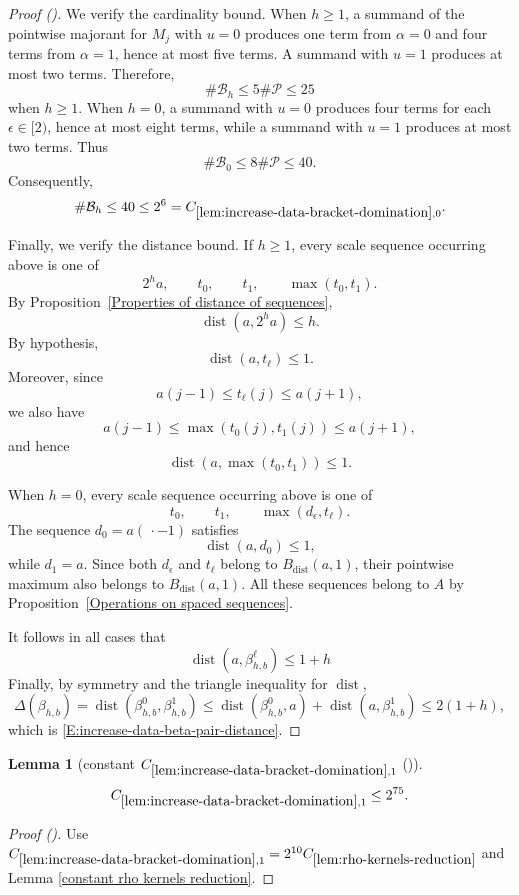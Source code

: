 \documentclass[12pt,reqno]{amsart}
\newcommand{\auto}{{({\tiny\faCar})}}
\theoremstyle{plain}
\newtheorem{lemma}[theorem]{Lemma}
\numberwithin{equation}{section}
\theoremstyle{remark}
\newcommand{\using}[1]{}
\DeclareMathOperator{\dist}{dist}
\begin{document}
\begin{proof}[Proof \auto]
We verify the cardinality bound. When \(h\geq1\), a summand of the
pointwise majorant for \(M_j\) with \(u=0\) produces one term from
\(\alpha=0\) and four terms from \(\alpha=1\), hence at most five
terms. A summand with \(u=1\) produces at most two terms. Therefore,
\[
\#\mathcal B_h
\leq
5\#\mathcal P
\leq
25
\]
when \(h\geq1\). When \(h=0\), a summand with \(u=0\) produces four
terms for each \(\epsilon\in[2)\), hence at most eight terms, while
a summand with \(u=1\) produces at most two terms. Thus
\[
\#\mathcal B_0
\leq
8\#\mathcal P
\leq
40.
\]
Consequently,
\[
\#\mathcal B_h
\leq
40
\leq
2^6
=
C_{\ref{lem:increase-data-bracket-domination},0}.
\]

Finally, we verify the distance bound. If \(h\geq1\), every scale
sequence occurring above is one of
\[
2^ha,\qquad
t_0,\qquad
t_1,\qquad
\max(t_0,t_1).
\]
By Proposition~\ref{Properties of distance of sequences},
\[
\dist(a,2^ha)\leq h.
\]
By hypothesis,
\[
\dist(a,t_\ell)\leq1.
\]
Moreover, since
\[
a(j-1)\leq t_\ell(j)\leq a(j+1),
\]
we also have
\[
a(j-1)
\leq
\max(t_0(j),t_1(j))
\leq
a(j+1),
\]
and hence
\[
\dist(a,\max(t_0,t_1))\leq1.
\]

When \(h=0\), every scale sequence occurring above is one of
\[
t_0,\qquad
t_1,\qquad
\max(d_\epsilon,t_\ell).
\]
The sequence \(d_0=a(\,\cdot-1)\) satisfies
\[
\dist(a,d_0)\leq1,
\]
while \(d_1=a\). Since both \(d_\epsilon\) and \(t_\ell\) belong to
\(B_{\dist}(a,1)\), their pointwise maximum also belongs to
\(B_{\dist}(a,1)\). All these sequences belong to \(A\) by
Proposition~\ref{Operations on spaced sequences}.

It follows in all cases that
\[
\dist(a,\beta_{h,b}^\ell)
\leq
1+h
\]
Finally, by symmetry and the triangle inequality for \(\dist\),
\[
\Delta(\beta_{h,b}) = \dist(\beta_{h,b}^0,\beta_{h,b}^1) \leq \dist(\beta_{h,b}^0,a) + \dist(a,\beta_{h,b}^1) \leq 2(1+h),
\]
which is
\eqref{E:increase-data-beta-pair-distance}.
\end{proof}

\begin{lemma}[constant $C_{\ref{lem:increase-data-bracket-domination},1}$ \auto]\label{constant increase data bracket domination}\using{lem:increase-data-bracket-domination}\using{lem:rho-kernels-reduction}\using{constant rho kernels reduction}
\begin{equation}\label{constant increase data bracket domination bound}
C_{\ref{lem:increase-data-bracket-domination},1}\le2^{75}.
\end{equation}
\end{lemma}
\begin{proof}[Proof \auto]
Use $C_{\ref{lem:increase-data-bracket-domination},1}=2^{10}C_{\ref{lem:rho-kernels-reduction}}$ and Lemma \ref{constant rho kernels reduction}.
\end{proof}
\end{document}
